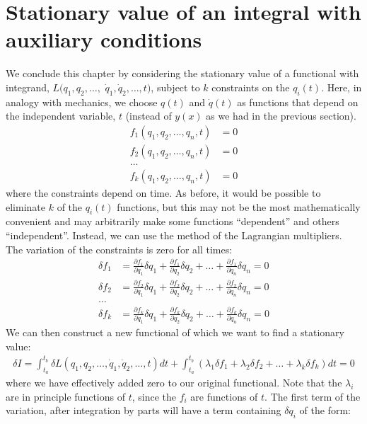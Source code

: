\section{Stationary value of an integral with auxiliary conditions}
We conclude this chapter by considering the stationary value of a functional with integrand, $L(q_1,q_2,\dots,$ $\dot{q}_1, \dot{q}_2,\dots,t)$, subject to $k$ constraints on the $q_i(t)$. Here, in analogy with mechanics, we choose $q(t)$ and $\dot q(t)$ as functions that depend on the independent variable, $t$ (instead of $y(x)$ as we had in the previous section).
\begin{align}
f_1(q_1, q_2, \dots, q_n, t)&=0\nonumber\\
f_2(q_1, q_2, \dots, q_n, t)&=0\nonumber\\
\dots\nonumber\\
f_k(q_1, q_2, \dots, q_n, t)&=0
\end{align}
where the constraints depend on time. As before, it would be possible to eliminate $k$ of the $q_i(t)$ functions, but this may not be the most mathematically convenient and may arbitrarily make some functions ``dependent'' and others ``independent''. Instead, we can use the method of the Lagrangian multipliers. The variation of the constraints is zero for all times:
\begin{align}
\delta f_1&=\frac{\partial f_1}{\partial q_1}\delta q_1 + \frac{\partial f_1}{\partial q_2}\delta q_2 +\dots+\frac{\partial f_1}{\partial q_n}\delta q_n=0\nonumber\\
\delta f_2&=\frac{\partial f_2}{\partial q_1}\delta q_1 + \frac{\partial f_2}{\partial q_2}\delta q_2 +\dots+\frac{\partial f_2}{\partial q_n}\delta q_n=0\nonumber\\
\dots\nonumber\\
\delta f_k&=\frac{\partial f_k}{\partial q_1}\delta q_1 + \frac{\partial f_k}{\partial q_2}\delta q_2 +\dots+\frac{\partial f_k}{\partial q_n}\delta q_n=0
\label{eqn:varconstraints}
\end{align}
We can then construct a new functional of which we want to find a stationary value:
\begin{align}
\delta I = \int_{t_a}^{t_b}  \delta L(q_1,q_2,\dots,\dot{q}_1, \dot{q}_2,\dots,t)dt+\int_{t_a}^{t_b} (\lambda_1 \delta f_1+\lambda_2 \delta f_2 +\dots +\lambda_k \delta f_k)dt=0
\end{align}
where we have effectively added zero to our original functional. Note that the $\lambda_i$ are in principle functions of $t$, since the $f_i$ are functions of $t$. The first term of the variation, after integration by parts will have a term containing $\delta q_i$ of the form:
